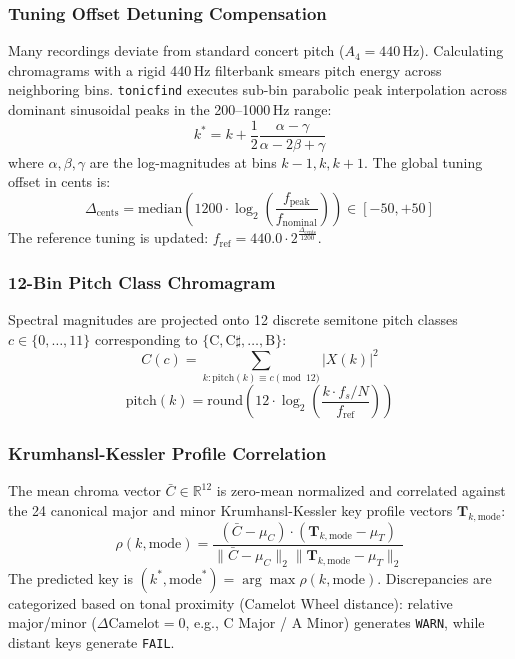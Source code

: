 \documentclass[10pt,journal,compsoc]{IEEEtran}
\begin{document}
\subsubsection{Tuning Offset Detuning Compensation}
Many recordings deviate from standard concert pitch ($A_4 = 440$\,Hz). Calculating chromagrams with a rigid 440\,Hz filterbank smears pitch energy across neighboring bins. \texttt{tonicfind} executes sub-bin parabolic peak interpolation across dominant sinusoidal peaks in the 200--1000\,Hz range:
\begin{equation}
k^* = k + \frac{1}{2} \frac{\alpha - \gamma}{\alpha - 2\beta + \gamma}
\label{eq:parabolic}
\end{equation}
where $\alpha, \beta, \gamma$ are the log-magnitudes at bins $k-1, k, k+1$. The global tuning offset in cents is:
\begin{equation}
\Delta_{\text{cents}} = \text{median} \left( 1200 \cdot \log_2 \left( \frac{f_{\text{peak}}}{f_{\text{nominal}}} \right) \right) \in [-50, +50]
\label{eq:cents}
\end{equation}
The reference tuning is updated: $f_{\text{ref}} = 440.0 \cdot 2^{\frac{\Delta_{\text{cents}}}{1200}}$.

\subsubsection{12-Bin Pitch Class Chromagram}
Spectral magnitudes are projected onto 12 discrete semitone pitch classes $c \in \{0, \dots, 11\}$ corresponding to $\{\text{C}, \text{C}\sharp, \dots, \text{B}\}$:
\begin{equation}
C(c) = \sum_{k : \text{pitch}(k) \equiv c \pmod{12}} |X(k)|^2
\label{eq:chroma}
\end{equation}
\begin{equation}
\text{pitch}(k) = \text{round} \left( 12 \cdot \log_2 \left( \frac{k \cdot f_s / N}{f_{\text{ref}}} \right) \right)
\label{eq:pitch_round}
\end{equation}

\subsubsection{Krumhansl-Kessler Profile Correlation}
The mean chroma vector $\bar{C} \in \mathbb{R}^{12}$ is zero-mean normalized and correlated against the 24 canonical major and minor Krumhansl-Kessler key profile vectors $\mathbf{T}_{k, \text{mode}}$:
\begin{equation}
\rho(k, \text{mode}) = \frac{(\bar{C} - \mu_C) \cdot (\mathbf{T}_{k, \text{mode}} - \mu_T)}{\|\bar{C} - \mu_C\|_2 \|\mathbf{T}_{k, \text{mode}} - \mu_T\|_2}
\label{eq:key_corr}
\end{equation}
The predicted key is $(k^*, \text{mode}^*) = \arg\max \rho(k, \text{mode})$. Discrepancies are categorized based on tonal proximity (Camelot Wheel distance): relative major/minor ($\Delta \text{Camelot} = 0$, e.g., C Major / A Minor) generates \texttt{WARN}, while distant keys generate \texttt{FAIL}.
\end{document}
